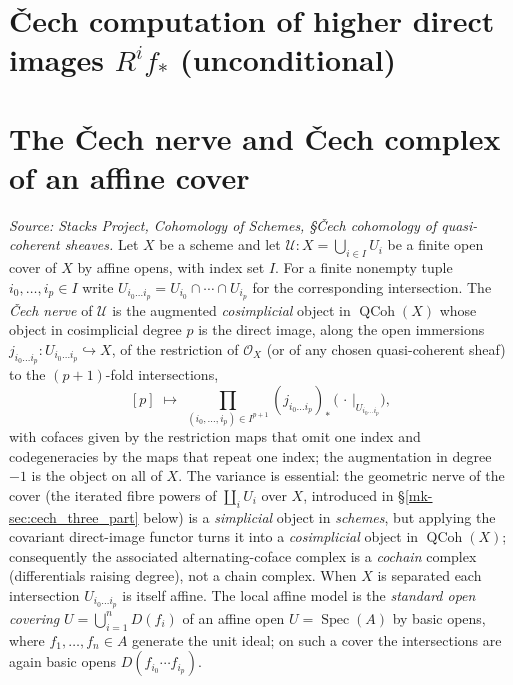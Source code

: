 \section{{\v C}ech computation of higher direct images $R^i f_*$ (unconditional)}
\label{mk-chap:Cohomology_CechHigherDirectImage}

\section{The {\v C}ech nerve and {\v C}ech complex of an affine cover}

\begin{definition}\label{mk-def:cech_nerve}
  \leanok

  \textit{Source: Stacks Project, Cohomology of Schemes, \S{\v C}ech cohomology of
  quasi-coherent sheaves.}
  Let \(X\) be a scheme and let
  \(\mathcal{U} : X = \bigcup_{i \in I} U_i\) be a finite open cover of \(X\) by
  affine opens, with index set \(I\). For a finite nonempty tuple
  \(i_0, \ldots, i_p \in I\) write
  \(U_{i_0 \ldots i_p} = U_{i_0} \cap \cdots \cap U_{i_p}\) for the corresponding
  intersection. The \emph{{\v C}ech nerve} of \(\mathcal{U}\) is the augmented
  \emph{cosimplicial} object in \(\operatorname{QCoh}(X)\) whose object in
  cosimplicial degree \(p\) is the direct image, along the open immersions
  \(j_{i_0 \ldots i_p} : U_{i_0 \ldots i_p} \hookrightarrow X\), of the restriction
  of \(\mathcal{O}_X\) (or of any chosen quasi-coherent sheaf) to the
  \((p+1)\)-fold intersections,
  \[
    [p] \;\longmapsto\;
      \prod_{(i_0, \ldots, i_p) \in I^{p+1}}
        (j_{i_0 \ldots i_p})_* \,\bigl(\,\cdot\,|_{U_{i_0 \ldots i_p}}\bigr),
  \]
  with cofaces given by the restriction maps that omit one index and
  codegeneracies by the maps that repeat one index; the augmentation in degree
  \(-1\) is the object on all of \(X\). The variance is essential: the geometric
  nerve of the cover (the iterated fibre powers of \(\coprod_i U_i\) over \(X\),
  introduced in \S\ref{mk-sec:cech_three_part} below) is a \emph{simplicial} object
  in \emph{schemes}, but applying the covariant direct-image functor turns it into
  a \emph{cosimplicial} object in \(\operatorname{QCoh}(X)\); consequently the
  associated alternating-coface complex is a \emph{cochain} complex (differentials
  raising degree), not a chain complex. When \(X\) is separated each intersection
  \(U_{i_0 \ldots i_p}\) is itself affine. The local affine model is the
  \emph{standard open covering} \(U = \bigcup_{i=1}^n D(f_i)\) of an affine open
  \(U = \operatorname{Spec}(A)\) by basic opens, where \(f_1, \ldots, f_n \in A\)
  generate the unit ideal; on such a cover the intersections are again basic opens
  \(D(f_{i_0} \cdots f_{i_p})\).
\end{definition}


